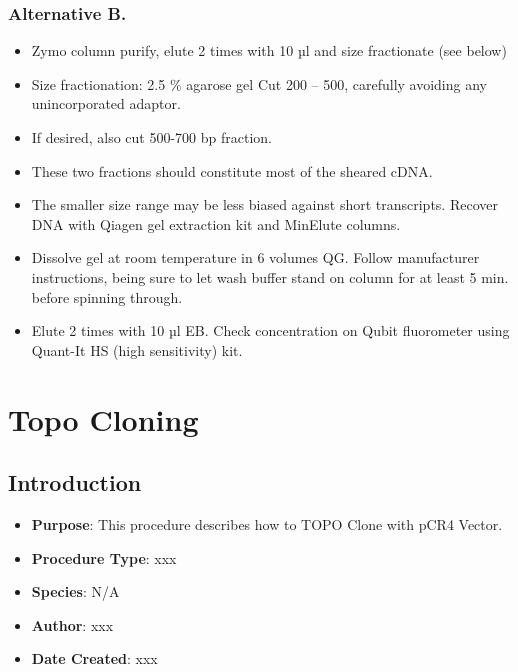 \documentclass[
  letterpaper,
  DIV=11,
  numbers=noendperiod]{scrreprt}
\providecommand{\tightlist}{%
  \setlength{\itemsep}{0pt}\setlength{\parskip}{0pt}}\usepackage{longtable,booktabs,array}
\begin{document}
\hypertarget{alternative-b.}{%
\subsection{Alternative B.}\label{alternative-b.}}

\begin{itemize}
\tightlist
\item
  Zymo column purify, elute 2 times with 10 µl and size fractionate (see
  below)
\item
  Size fractionation: 2.5 \% agarose gel Cut 200 -- 500, carefully
  avoiding any unincorporated adaptor.
\item
  If desired, also cut 500-700 bp fraction.
\item
  These two fractions should constitute most of the sheared cDNA.
\item
  The smaller size range may be less biased against short transcripts.
  Recover DNA with Qiagen gel extraction kit and MinElute columns.
\item
  Dissolve gel at room temperature in 6 volumes QG. Follow manufacturer
  instructions, being sure to let wash buffer stand on column for at
  least 5 min. before spinning through.
\item
  Elute 2 times with 10 µl EB. Check concentration on Qubit fluorometer
  using Quant-It HS (high sensitivity) kit.
\end{itemize}

\hypertarget{sec-molecular-TopoClone}{%
\chapter{Topo Cloning}\label{sec-molecular-TopoClone}}

\hypertarget{introduction-25}{%
\section{Introduction}\label{introduction-25}}

\begin{itemize}
\tightlist
\item
  \textbf{Purpose}: This procedure describes how to TOPO Clone with pCR4
  Vector.
\item
  \textbf{Procedure Type}: xxx
\item
  \textbf{Species}: N/A
\item
  \textbf{Author}: xxx
\item
  \textbf{Date Created}: xxx
\end{itemize}
\end{document}

